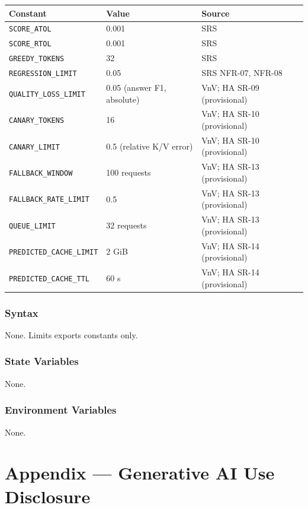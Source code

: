 \documentclass[12pt, titlepage]{article}
\begin{document}
\begin{center}
\renewcommand{\arraystretch}{1.2}
\begin{tabular}{l l l}
\toprule
\textbf{Constant} & \textbf{Value} & \textbf{Source}\\
\midrule
\texttt{SCORE\_ATOL} & 0.001 & SRS\\
\texttt{SCORE\_RTOL} & 0.001 & SRS\\
\texttt{GREEDY\_TOKENS} & 32 & SRS\\
\texttt{REGRESSION\_LIMIT} & 0.05 & SRS NFR-07, NFR-08\\
\texttt{QUALITY\_LOSS\_LIMIT} & 0.05 (answer F1, absolute) & VnV; HA SR-09 (provisional)\\
\texttt{CANARY\_TOKENS} & 16 & VnV; HA SR-10 (provisional)\\
\texttt{CANARY\_LIMIT} & 0.5 (relative K/V error) & VnV; HA SR-10 (provisional)\\
\texttt{FALLBACK\_WINDOW} & 100 requests & VnV; HA SR-13 (provisional)\\
\texttt{FALLBACK\_RATE\_LIMIT} & 0.5 & VnV; HA SR-13 (provisional)\\
\texttt{QUEUE\_LIMIT} & 32 requests & VnV; HA SR-13 (provisional)\\
\texttt{PREDICTED\_CACHE\_LIMIT} & 2 GiB & VnV; HA SR-14 (provisional)\\
\texttt{PREDICTED\_CACHE\_TTL} & 60 s & VnV; HA SR-14 (provisional)\\
\bottomrule
\end{tabular}
\end{center}

\subsubsection*{Syntax}

None. Limits exports constants only.

\subsubsection*{State Variables}

None.

\subsubsection*{Environment Variables}

None.

\newpage
\section*{Appendix --- Generative AI Use Disclosure}
\end{document}
